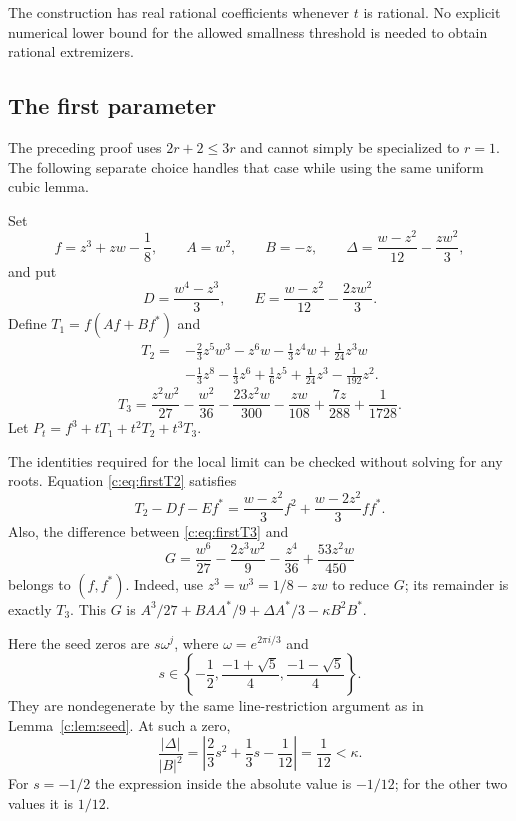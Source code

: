 \documentclass[UTF8,11pt]{ctexart}
\theoremstyle{definition}
\numberwithin{equation}{section}
\begin{document}
The construction has real rational coefficients whenever $t$ is
rational. No explicit numerical lower bound for the allowed smallness
threshold is needed to obtain rational extremizers.

\subsection{The first parameter}\label{c:sec:first}

The preceding proof uses $2r+2\le3r$ and cannot simply be specialized
to $r=1$. The following separate choice handles that case while using
the same uniform cubic lemma.

Set
\[
 f=z^3+zw-\frac18,\qquad A=w^2,\qquad B=-z,\qquad
 \Delta=\frac{w-z^2}{12}-\frac{zw^2}{3},
\]
and put
\[
 D=\frac{w^4-z^3}{3},\qquad
 E=\frac{w-z^2}{12}-\frac{2zw^2}{3}.
\]
Define $T_1=f(Af+Bf^*)$ and
\begin{equation}\label{c:eq:firstT2}
\begin{split}
 T_2={}&-\frac23z^5w^3-z^6w-\frac13z^4w+\frac1{24}z^3w\\
 &-\frac13z^8-\frac13z^6+\frac16z^5+\frac1{24}z^3-\frac1{192}z^2.
\end{split}
\end{equation}
\begin{equation}\label{c:eq:firstT3}
 T_3=\frac{z^2w^2}{27}-\frac{w^2}{36}
       -\frac{23z^2w}{300}-\frac{zw}{108}
       +\frac{7z}{288}+\frac1{1728}.
\end{equation}
Let $P_t=f^3+tT_1+t^2T_2+t^3T_3$.

The identities required for the local limit can be checked without
solving for any roots. Equation \eqref{c:eq:firstT2} satisfies
\begin{equation}\label{c:eq:firstidentity}
 T_2-Df-Ef^*
   =\frac{w-z^2}{3}f^2+\frac{w-2z^2}{3}ff^*.
\end{equation}
Also, the difference between \eqref{c:eq:firstT3} and
\[
 G=\frac{w^6}{27}-\frac{2z^3w^2}{9}-\frac{z^4}{36}
                  +\frac{53z^2w}{450}
\]
belongs to $(f,f^*)$. Indeed, use $z^3=w^3=1/8-zw$ to reduce $G$;
its remainder is exactly $T_3$. This $G$ is
$A^3/27+BAA^*/9+\Delta A^*/3-\kappa B^2B^*$.

Here the seed zeros are $s\omega^j$, where $\omega=e^{2\pi i/3}$ and
\[
 s\in\left\{-\frac12,\frac{-1+\sqrt5}{4},
                       \frac{-1-\sqrt5}{4}\right\}.
\]
They are nondegenerate by the same line-restriction argument as in
Lemma~\ref{c:lem:seed}. At such a zero,
\[
 \frac{|\Delta|}{|B|^2}
  =\left|\frac23s^2+\frac13s-\frac1{12}\right|=\frac1{12}<\kappa.
\]
For $s=-1/2$ the expression inside the absolute value is $-1/12$;
for the other two values it is $1/12$.
\end{document}
